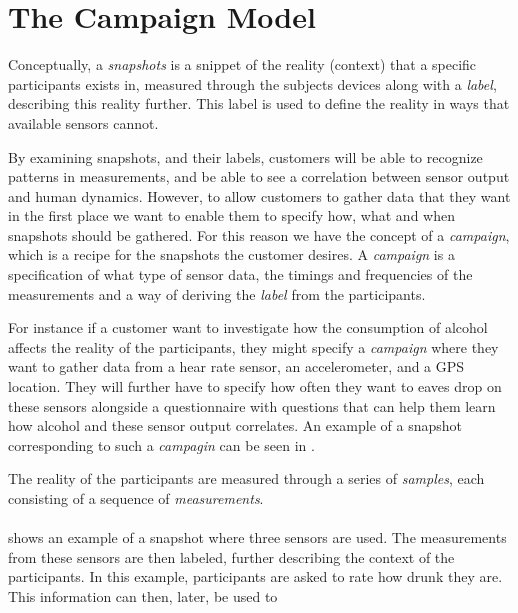 
\section{The Campaign Model}

Conceptually, a \emph{snapshots} is a snippet of the reality (context) that a specific participants exists in, measured through the subjects devices along with a \emph{label}, describing this reality further. This label is used to define the reality in ways that available sensors cannot. 


By examining snapshots, and their labels, customers will be able to recognize patterns in measurements, and be able to see a correlation between sensor output and human dynamics. However, to allow customers to gather data that they want in the first place we want to enable them to specify how, what and when snapshots should be gathered. For this reason we have the concept of a \emph{campaign}, which is a recipe for the snapshots the customer desires. A \emph{campaign} is a specification of what type of sensor data, the timings and frequencies of the measurements and a way of deriving the \emph{label} from the participants.

For instance if a customer want to investigate how the consumption of alcohol affects the reality of the participants, they might specify a \emph{campaign} where they want to gather data from a hear rate sensor, an accelerometer, and a GPS location. They will further have to specify how often they want to eaves drop on these sensors alongside a questionnaire with questions that can help them learn how alcohol and these sensor output correlates. An example of a snapshot corresponding to such a \emph{campagin} can be seen in .

The reality of the participants are measured through a series of \emph{samples}, each consisting of a sequence of \emph{measurements}.
\\\\
 shows an example of a snapshot where three sensors are used. The measurements from these sensors are then labeled, further describing the context of the participants. In this example, participants are asked to rate how drunk they are. This information can then, later, be used to 

